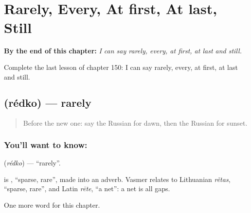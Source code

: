 
\chapter{Rarely, Every, At first, At last, Still}
\label{ch:ru-rarely-every-at-first-at-last-still}

\begin{chapteropening}
\textbf{By the end of this chapter:} \emph{I can say rarely, every, at first, at last and still.}

Complete the last lesson of chapter 150: I can say rarely, every, at first, at last and still.
\end{chapteropening}

\section[\texorpdfstring{\ru{редко} (rédko)}{редко (rédko)}]{ (rédko) — rarely}

\label{lesson:RU-C150-redko}



\begin{quote}
Before the new one: say the Russian for dawn, then the Russian for sunset.
\end{quote}

\subsection*{You'll want to know: }
\textbf{} (\emph{rédko}) — \textquotedblleft{}rarely\textquotedblright{}.

\begin{cousinweb}
\textbf{} is \emph{}, \textquotedblleft{}sparse, rare\textquotedblright{}, made into an adverb. Vasmer relates \emph{} to Lithuanian \emph{rẽtas}, \textquotedblleft{}sparse, rare\textquotedblright{}, and Latin \emph{rēte}, \textquotedblleft{}a net\textquotedblright{}: a net is all gaps.
\end{cousinweb}

\begin{grammarlens}[title={What you've built}]
One more word for this chapter.
\end{grammarlens}

